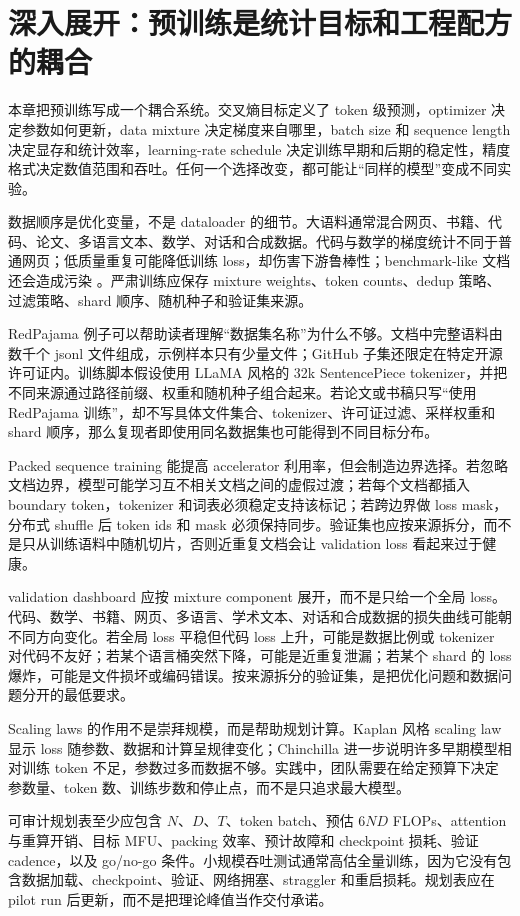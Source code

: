 \documentclass[UTF8,zihao=-4,openany]{ctexbook}
\begin{document}
\section{深入展开：预训练是统计目标和工程配方的耦合}
本章把预训练写成一个耦合系统。交叉熵目标定义了 token 级预测，optimizer 决定参数如何更新，data mixture 决定梯度来自哪里，batch size 和 sequence length 决定显存和统计效率，learning-rate schedule 决定训练早期和后期的稳定性，精度格式决定数值范围和吞吐。任何一个选择改变，都可能让“同样的模型”变成不同实验。

数据顺序是优化变量，不是 dataloader 的细节。大语料通常混合网页、书籍、代码、论文、多语言文本、数学、对话和合成数据。代码与数学的梯度统计不同于普通网页；低质量重复可能降低训练 loss，却伤害下游鲁棒性；benchmark-like 文档还会造成污染 \cite{shi2023detecting,xu2024benchmark}。严肃训练应保存 mixture weights、token counts、dedup 策略、过滤策略、shard 顺序、随机种子和验证集来源。

RedPajama 例子可以帮助读者理解“数据集名称”为什么不够。文档中完整语料由数千个 jsonl 文件组成，示例样本只有少量文件；GitHub 子集还限定在特定开源许可证内。训练脚本假设使用 LLaMA 风格的 32k SentencePiece tokenizer，并把不同来源通过路径前缀、权重和随机种子组合起来。若论文或书稿只写“使用 RedPajama 训练”，却不写具体文件集合、tokenizer、许可证过滤、采样权重和 shard 顺序，那么复现者即使用同名数据集也可能得到不同目标分布。

Packed sequence training 能提高 accelerator 利用率，但会制造边界选择。若忽略文档边界，模型可能学习互不相关文档之间的虚假过渡；若每个文档都插入 boundary token，tokenizer 和词表必须稳定支持该标记；若跨边界做 loss mask，分布式 shuffle 后 token ids 和 mask 必须保持同步。验证集也应按来源拆分，而不是只从训练语料中随机切片，否则近重复文档会让 validation loss 看起来过于健康。

validation dashboard 应按 mixture component 展开，而不是只给一个全局 loss。代码、数学、书籍、网页、多语言、学术文本、对话和合成数据的损失曲线可能朝不同方向变化。若全局 loss 平稳但代码 loss 上升，可能是数据比例或 tokenizer 对代码不友好；若某个语言桶突然下降，可能是近重复泄漏；若某个 shard 的 loss 爆炸，可能是文件损坏或编码错误。按来源拆分的验证集，是把优化问题和数据问题分开的最低要求。

Scaling laws 的作用不是崇拜规模，而是帮助规划计算。Kaplan 风格 scaling law 显示 loss 随参数、数据和计算呈规律变化；Chinchilla 进一步说明许多早期模型相对训练 token 不足，参数过多而数据不够。实践中，团队需要在给定预算下决定参数量、token 数、训练步数和停止点，而不是只追求最大模型。

可审计规划表至少应包含 $N$、$D$、$T$、token batch、预估 $6ND$ FLOPs、attention 与重算开销、目标 MFU、packing 效率、预计故障和 checkpoint 损耗、验证 cadence，以及 go/no-go 条件。小规模吞吐测试通常高估全量训练，因为它没有包含数据加载、checkpoint、验证、网络拥塞、straggler 和重启损耗。规划表应在 pilot run 后更新，而不是把理论峰值当作交付承诺。
\end{document}
